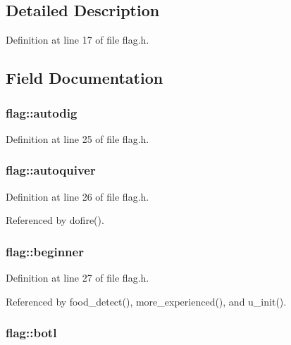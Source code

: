\subsection{Detailed Description}


Definition at line 17 of file flag.\+h.



\subsection{Field Documentation}
\hypertarget{structflag_a25cd860cd5077869e497f6c2b45fdd7c}{
\subsubsection[{autodig}]{ flag\+::autodig}}\label{structflag_a25cd860cd5077869e497f6c2b45fdd7c}


Definition at line 25 of file flag.\+h.

\hypertarget{structflag_ad18c2414f9c7c20bd9f909939c1dde52}{
\subsubsection[{autoquiver}]{ flag\+::autoquiver}}\label{structflag_ad18c2414f9c7c20bd9f909939c1dde52}


Definition at line 26 of file flag.\+h.



Referenced by dofire().

\hypertarget{structflag_ac488811edaec9208018e9abb54679274}{
\subsubsection[{beginner}]{ flag\+::beginner}}\label{structflag_ac488811edaec9208018e9abb54679274}


Definition at line 27 of file flag.\+h.



Referenced by food\+\_\+detect(), more\+\_\+experienced(), and u\+\_\+init().

\hypertarget{structflag_a51f16d01a910b52fdf0c05a44739f7d8}{
\subsubsection[{botl}]{ flag\+::botl}}\label{structflag_a51f16d01a910b52fdf0c05a44739f7d8}


